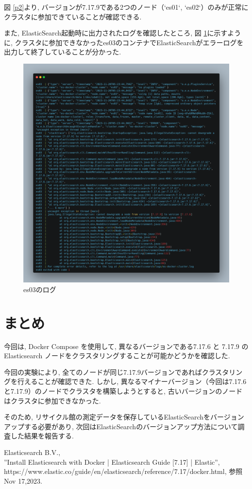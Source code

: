 \documentclass[a4j,12pt,]{jarticle}
\begin{document}
図 \ref{p2}より, バージョンが7.17.9である2つのノード（`es01`, `es02`）のみが正常にクラスタに参加できていることが確認できる.

また, ElasticSearch起動時に出力されたログを確認したところ, 図 \ref{p3}に示すように, クラスタに参加できなかったes03のコンテナでElasticSearchがエラーログを出力して終了していることが分かった.

\begin{figure}[H]
  \begin{center}
    \includegraphics[width=160mm]{log.png}
    \caption{es03のログ}
    \label{p3}
  \end{center}
\end{figure}

\section{まとめ}
今回は, Docker Compose を使用して, 異なるバージョンである7.17.6 と 7.17.9 の Elasticsearch ノードをクラスタリングすることが可能かどうかを確認した.

今回の実験により, 全てのノードが同じ7.17.9バージョンであればクラスタリングを行えることが確認できた. しかし, 異なるマイナーバージョン（今回は7.17.6と7.17.9）のノードでクラスタを構築しようとすると, 古いバージョンのノードはクラスタに参加できなかった.

そのため, リサイクル館の測定データを保存しているElasticSearchをバージョンアップする必要があり, 次回はElasticSearchのバージョンアップ方法について調査した結果を報告する.

\begin{thebibliography}{5}
  Elasticsearch B.V.,\\ ”Install Elasticsearch with Docker | Elasticsearch Guide [7.17] | Elastic”, https://www.elastic.co/guide/en/elasticsearch/reference/7.17/docker.html, 参照 Nov 17,2023.
\end{thebibliography}
\end{document}
